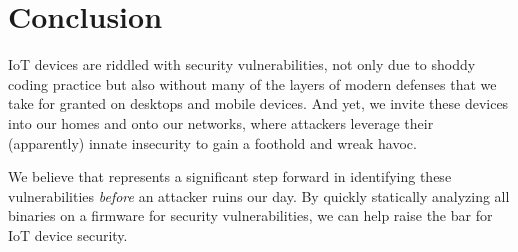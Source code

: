 \section{Conclusion}
\label{sec:mango-conclusion}

IoT devices are riddled with security vulnerabilities, not only due to shoddy coding practice but also without many of the layers of modern defenses that we take for granted on desktops and mobile devices.
And yet, we invite these devices into our homes and onto our networks, where attackers leverage their (apparently) innate insecurity to gain a foothold and wreak havoc.

We believe that \mango represents a significant step forward in identifying these vulnerabilities \emph{before} an attacker ruins our day.
By quickly statically analyzing all binaries on a firmware for security vulnerabilities, we can help raise the bar for IoT device security.
